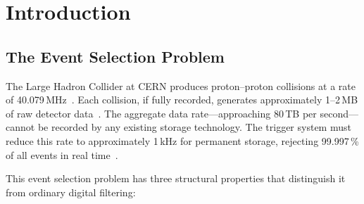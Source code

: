\documentclass[twocolumn,10pt,a4paper]{article}
\theoremstyle{thmstyle}
\theoremstyle{definition}
\theoremstyle{remark}
\newcommand{\kB}{k_{\mathrm{B}}}
\begin{document}
\begin{abstract}
We derive all seven fundamental constants in categorical angular units:
$c = 2\pi\,\mathrm{rad/tick}$, $\hbar = E_{\mathrm{tick}}/(2\pi)$,
$\kB = E_{\mathrm{tick}}/\ln(d+1)$, $m_0 = E_{\mathrm{tick}} \nu_0
/(4\pi^2)$, with the gravitational constant $G$ remaining the unique
irreducible coupling not reducible to tick counting and $2\pi$ geometry.
The HL-LHC upgrade to $d = 4$ independent subsystems reduces the
Planck depth from 60 to 52, recovering eight bunch crossings of
categorical resolution headroom.

\bigskip
\noindent\textbf{Keywords:} LHC trigger, composition-inflation,
temporal programming, S-entropy, backward trajectory completion,
virtual sub-states, virtual particles, Planck depth, Ward identity,
S-matrix, categorical mechanics, bunch crossing, coincidence detection
\end{abstract}

\tableofcontents

\section{Introduction}
\label{sec:introduction}

\subsection{The Event Selection Problem}

The Large Hadron Collider at CERN produces proton--proton collisions at
a rate of 40.079\,MHz~\citep{evans2008lhc,lhc_bunch_structure}. Each
collision, if fully recorded, generates approximately 1--2\,MB of raw
detector data~\citep{atlas2008detector,cms2008detector}. The aggregate
data rate---approaching 80\,TB per second---cannot be recorded by any
existing storage technology. The trigger system must reduce this rate
to approximately 1\,kHz for permanent storage, rejecting
99.997\,\% of all events in real time~\citep{atlas_trigger_tdr,
atlas_trigger_run2}.

This event selection problem has three structural properties that
distinguish it from ordinary digital filtering:
\end{document}
